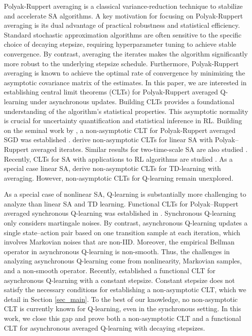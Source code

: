 \documentclass{opt2025} %
\begin{document}
Polyak-Ruppert averaging is a classical variance-reduction technique to stabilize and accelerate SA algorithms. A key motivation for focusing on Polyak-Ruppert averaging is its dual advantage of practical robustness and statistical efficiency. Standard stochastic approximation algorithms are often sensitive to the specific choice of decaying stepsize, requiring hyperparameter tuning to achieve stable convergence. By contrast, averaging the iterates makes the algorithm significantly more robust to the underlying stepsize schedule. Furthermore, Polyak-Ruppert averaging is known to achieve the optimal rate of convergence by minimizing the asymptotic covariance matrix of the estimates. In this paper, we are interested in establishing central limit theorems (CLTs) for Polyak-Ruppert averaged Q-learning under asynchronous updates. Building CLTs provides a foundational understanding of the algorithm's statistical properties. This asymptotic normality is crucial for uncertainty quantification and statistical inference in RL. Building on the seminal work by \citet{polyak1992acceleration}, a non-asymptotic CLT for Polyak-Ruppert averaged SGD was established \citep{anastasiou2019normal}. \citet{mou2020linear,samsonov2025statistical} derive non-asymptotic CLTs for linear SA with Polyak–Ruppert
averaged iterates. Similar results for two-time-scale SA are also studied \citep{han2024decoupled, hu2024central, kong2025nonasymptotic}. Recently, CLTs for SA with applications to RL algorithms are studied \citep{borkar2025ode}. As a special case linear SA, \citet{srikant2024rates, samsonov2024gaussian} derive non-asymptotic CLTs for TD-learning with averaging. However, non-asymptotic CLTs for Q-learning remain unexplored.

As a special case of nonlinear SA, Q-learning is substantially more challenging to analyze than linear SA and TD learning. Functional CLTs for Polyak–Ruppert averaged synchronous Q-learning was established in \citet{xie2022statistical, li2023statistical, panda2025asymptotic}. Synchronous Q-learning only considers martingale noises. By contrast, asynchronous Q-learning updates a single state–action pair based on one transition sample at each iteration, which involves Markovian noises that are non-IID. Moreover, the empirical Bellman operator in asynchronous Q-learning is non-smooth. Thus, the challenges in analyzing asynchronous Q-learning come from nonlinearity, Markovian samples, and a non-smooth operator. Recently, \citet{zhang2024constant} established a functional CLT for asynchronous Q-learning with a constant stepsize. Constant stepsize does not satisfy the necessary conditions for establishing a non-asymptotic CLT, which we detail in Section \ref{sec_main}. To the best of our knowledge, no non-asymptotic CLT is currently known for Q-learning, even in the synchronous setting. In this work, we close this gap and prove both a non-asymptotic CLT and a functional CLT for asynchronous averaged Q-learning with decaying stepsizes.
\end{document}
